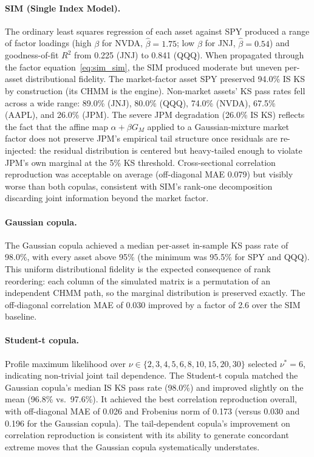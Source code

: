 \paragraph{SIM (Single Index Model).}
The ordinary least squares regression of each asset against SPY produced a range of factor loadings (high $\beta$ for NVDA, $\hat{\beta} = 1.75$; low $\beta$ for JNJ, $\hat{\beta} = 0.54$) and goodness-of-fit $R^2$ from 0.225 (JNJ) to 0.841 (QQQ).
When propagated through the factor equation~\eqref{eq:sim_sim}, the SIM produced moderate but uneven per-asset distributional fidelity.
The market-factor asset SPY preserved 94.0\% IS KS by construction (its CHMM is the engine).
Non-market assets' KS pass rates fell across a wide range: 89.0\% (JNJ), 80.0\% (QQQ), 74.0\% (NVDA), 67.5\% (AAPL), and 26.0\% (JPM).
The severe JPM degradation (26.0\% IS KS) reflects the fact that the affine map $\alpha + \beta G_M$ applied to a Gaussian-mixture market factor does not preserve JPM's empirical tail structure once residuals are re-injected: the residual distribution is centered but heavy-tailed enough to violate JPM's own marginal at the 5\% KS threshold.
Cross-sectional correlation reproduction was acceptable on average (off-diagonal MAE 0.079) but visibly worse than both copulas, consistent with SIM's rank-one decomposition discarding joint information beyond the market factor.

\paragraph{Gaussian copula.}
The Gaussian copula achieved a median per-asset in-sample KS pass rate of 98.0\%, with every asset above 95\% (the minimum was 95.5\% for SPY and QQQ).
This uniform distributional fidelity is the expected consequence of rank reordering: each column of the simulated matrix is a permutation of an independent CHMM path, so the marginal distribution is preserved exactly.
The off-diagonal correlation MAE of 0.030 improved by a factor of 2.6 over the SIM baseline.

\paragraph{Student-t copula.}
Profile maximum likelihood over $\nu \in \{2, 3, 4, 5, 6, 8, 10, 15, 20, 30\}$ selected $\nu^* = 6$, indicating non-trivial joint tail dependence.
The Student-t copula matched the Gaussian copula's median IS KS pass rate (98.0\%) and improved slightly on the mean (96.8\% vs.\ 97.6\%).
It achieved the best correlation reproduction overall, with off-diagonal MAE of 0.026 and Frobenius norm of 0.173 (versus 0.030 and 0.196 for the Gaussian copula).
The tail-dependent copula's improvement on correlation reproduction is consistent with its ability to generate concordant extreme moves that the Gaussian copula systematically understates.

